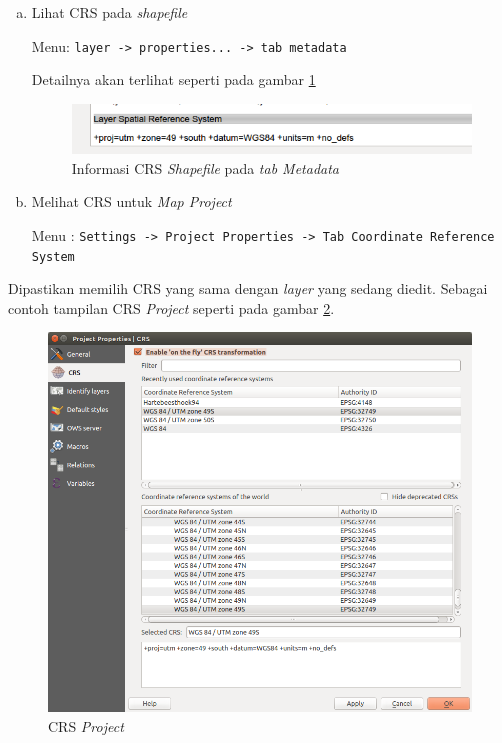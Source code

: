 \begin{enumerate}[a.]
  \item Lihat CRS pada \textit{shapefile}
  
  Menu: \texttt{layer -> properties... -> tab metadata}
  
  Detailnya akan terlihat seperti pada gambar \ref{fig:crsshapefile}
  
  \begin{figure}[H]
    \centering
    \includegraphics[width=1\textwidth]{./resources/047-crs-shapefile}
    \caption{Informasi CRS \textit{Shapefile} pada \textit{tab Metadata}}
    \label{fig:crsshapefile}
  \end{figure}
  
  \item Melihat CRS untuk \textit{Map Project}
  
  Menu : \texttt{Settings -> Project Properties -> Tab Coordinate Reference System}
\end{enumerate}

  Dipastikan memilih CRS yang sama dengan \textit{layer} yang sedang diedit. Sebagai contoh tampilan CRS \textit{Project} seperti pada gambar \ref{fig:crsproject}.
  
  \begin{figure}[H]
    \centering
    \includegraphics[width=1\textwidth]{./resources/048-crs-project}
    \caption{CRS \textit{Project}}
    \label{fig:crsproject}
  \end{figure}


